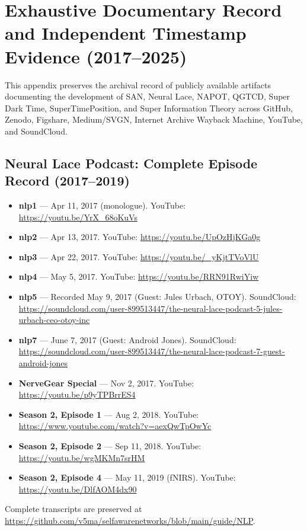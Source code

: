 \section{Exhaustive Documentary Record and Independent Timestamp Evidence (2017--2025)}
\label{app:documentary-record}

This appendix preserves the archival record of publicly available artifacts documenting the development of SAN, Neural Lace, NAPOT, QGTCD, Super Dark Time, SuperTimePosition, and Super Information Theory across GitHub, Zenodo, Figshare, Medium/SVGN, Internet Archive Wayback Machine, YouTube, and SoundCloud.

\subsection{Neural Lace Podcast: Complete Episode Record (2017--2019)}
\begin{itemize}
  \item \textbf{nlp1} --- Apr 11, 2017 (monologue). YouTube: \url{https://youtu.be/YrX_68oKuVs}
  \item \textbf{nlp2} --- Apr 13, 2017. YouTube: \url{https://youtu.be/UpOzHjKGa0g}
  \item \textbf{nlp3} --- Apr 22, 2017. YouTube: \url{https://youtu.be/_yKjtTVoVlU}
  \item \textbf{nlp4} --- May 5, 2017. YouTube: \url{https://youtu.be/RRN91RwiYiw}
  \item \textbf{nlp5} --- Recorded May 9, 2017 (Guest: Jules Urbach, OTOY). SoundCloud: \url{https://soundcloud.com/user-899513447/the-neural-lace-podcast-5-jules-urbach-ceo-otoy-inc}
  \item \textbf{nlp7} --- June 7, 2017 (Guest: Android Jones). SoundCloud: \url{https://soundcloud.com/user-899513447/the-neural-lace-podcast-7-guest-android-jones}
  \item \textbf{NerveGear Special} --- Nov 2, 2017. YouTube: \url{https://youtu.be/p9yTPBrrES4}
  \item \textbf{Season 2, Episode 1} --- Aug 2, 2018. YouTube: \url{https://www.youtube.com/watch?v=aexQwTpOwYc}
  \item \textbf{Season 2, Episode 2} --- Sep 11, 2018. YouTube: \url{https://youtu.be/wgMKMn7srHM}
  \item \textbf{Season 2, Episode 4} --- May 11, 2019 (fNIRS). YouTube: \url{https://youtu.be/DlfAOM4dx90}
\end{itemize}
Complete transcripts are preserved at \url{https://github.com/v5ma/selfawarenetworks/blob/main/guide/NLP}.

